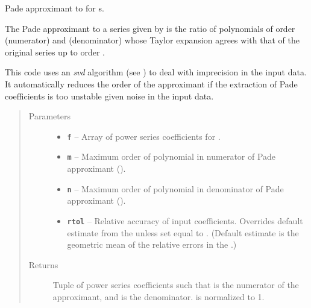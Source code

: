 \documentclass[letterpaper,10pt,english]{sphinxmanual}
\begin{document}

\begin{fulllineitems}
\label{g2tools:g2tools.pade_gvar}
\code{{[}m,n{]}} Pade approximant to  for s.

The \code{{[}m,n{]}} Pade approximant to a series given by
 is the ratio of  polynomials of order 
(numerator) and  (denominator) whose  Taylor expansion agrees
with that of the original series up to order .

This code uses an \emph{svd} algorithm (see {\hyperref[g2tools:g2tools.pade_svd]{\emph{}}}) to deal with
imprecision in the input data. It automatically reduces
the order of the approximant if the extraction of Pade coefficients
is too unstable given noise in the input data.
\begin{quote}\begin{description}
\item[{Parameters}] \leavevmode\begin{itemize}
\item {} 
\textbf{\texttt{f}} -- Array  of power series coefficients for .

\item {} 
\textbf{\texttt{m}} -- Maximum order of polynomial in numerator of Pade
approximant ().

\item {} 
\textbf{\texttt{n}} -- Maximum order of polynomial in denominator of Pade
approximant ().

\item {} 
\textbf{\texttt{rtol}} -- Relative accuracy of input coefficients. Overrides
default estimate from the  unless set equal to .
(Default estimate is the geometric mean of the relative errors
in the .)

\end{itemize}

\item[{Returns}] \leavevmode
Tuple of power series coefficients  such that
 is the numerator of the approximant,
and  is the denominator.  is
normalized to 1.

\end{description}\end{quote}

\end{fulllineitems}
\end{document}
